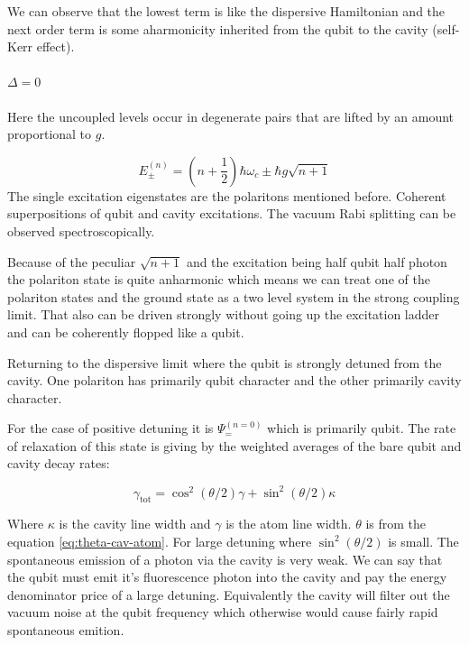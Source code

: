 \documentclass[12pt]{article}
\numberwithin{equation}{subsection}
\newcommand\ask[1]{
{%
}
}
\newcommand\page[1]{
{
}
}
\begin{document}
We can observe that the lowest term is like the dispersive Hamiltonian \label{eq:dispersiveH} and the next order term is some aharmonicity inherited from the qubit to the cavity (self-Kerr effect). 

\paragraph{$\Delta = 0$}  Here the uncoupled levels occur in degenerate pairs that are lifted by an amount proportional to $g$.

\begin{equation}
    E^{(n)}_\pm =\left(n+\frac{1}{2}\right) \hbar \omega_c \pm \hbar g \sqrt{n+1}
\end{equation}
The single excitation eigenstates are the polaritons mentioned before. Coherent superpositions of qubit and cavity excitations. The vacuum Rabi splitting can be observed spectroscopically. 
\page{80/87}
Because of the peculiar $\sqrt{n+1}$ and the excitation being half qubit half photon the polariton state is quite anharmonic which means we can treat one of the polariton states and the ground state as a two level system in the strong coupling limit. That also can be driven strongly without going up the excitation ladder and can be coherently flopped like a qubit.

Returning to the dispersive limit where the qubit is strongly detuned from the cavity. One polariton has primarily qubit character and the other primarily cavity character.

\page{81/88}

For the case of positive detuning it is $\Psi_=^{(n=0)}$ which is primarily qubit.
The rate of relaxation of this state is giving by the weighted averages of the bare qubit and cavity decay rates:

\begin{equation}
    \gamma_{\textrm{tot}} = \cos^2(\theta/2)\gamma + \sin^2(\theta/2)\kappa
\end{equation}

Where $\kappa$ is the cavity line width and $ \gamma$ is the atom line width. $\theta$ is from the equation \ref{eq:theta-cav-atom}.
For large detuning where $\sin^2(\theta/2)$ is small. The spontaneous emission of a photon via the cavity is very weak. We can say that the qubit must emit it's fluorescence photon into the cavity and pay the energy denominator price of a large detuning. Equivalently the cavity will filter out the vacuum noise at the qubit frequency which otherwise would cause fairly rapid spontaneous emition. 
\ask{this last sentence is for large detuning too, right?}
\page{82/89}
\end{document}
